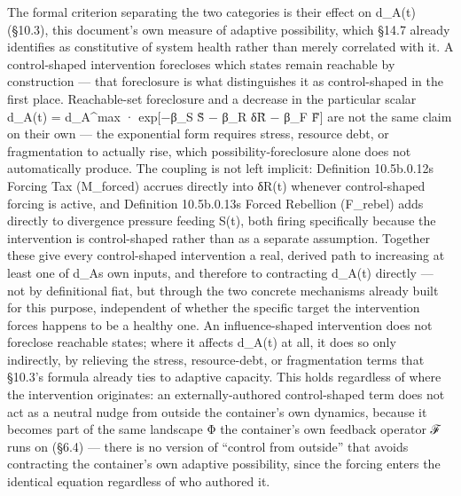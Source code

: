 \documentclass[
]{article}
\begin{document}
The formal criterion separating the two categories is their effect on
d\_A(t) (§10.3), this document's own measure of adaptive possibility,
which §14.7 already identifies as constitutive of system health rather
than merely correlated with it. A control-shaped intervention forecloses
which states remain reachable by construction --- that foreclosure is
what distinguishes it as control-shaped in the first place.
Reachable-set foreclosure and a decrease in the particular scalar
d\_A(t) = d\_A\^{}max · exp{[}−β\_S S̃ − β\_R δR̃ − β\_F F̃{]} are not the
same claim on their own --- the exponential form requires stress,
resource debt, or fragmentation to actually rise, which
possibility-foreclosure alone does not automatically produce. The
coupling is not left implicit: Definition 10.5b.0.12s Forcing Tax
(M\_forced) accrues directly into δR(t) whenever control-shaped forcing
is active, and Definition 10.5b.0.13s Forced Rebellion (F\_rebel) adds
directly to divergence pressure feeding S(t), both firing specifically
because the intervention is control-shaped rather than as a separate
assumption. Together these give every control-shaped intervention a
real, derived path to increasing at least one of d\_As own inputs, and
therefore to contracting d\_A(t) directly --- not by definitional fiat,
but through the two concrete mechanisms already built for this purpose,
independent of whether the specific target the intervention forces
happens to be a healthy one. An influence-shaped intervention does not
foreclose reachable states; where it affects d\_A(t) at all, it does so
only indirectly, by relieving the stress, resource-debt, or
fragmentation terms that §10.3's formula already ties to adaptive
capacity. This holds regardless of where the intervention originates: an
externally-authored control-shaped term does not act as a neutral nudge
from outside the container's own dynamics, because it becomes part of
the same landscape Φ the container's own feedback operator ℱ runs on
(§6.4) --- there is no version of ``control from outside'' that avoids
contracting the container's own adaptive possibility, since the forcing
enters the identical equation regardless of who authored it.
\end{document}
